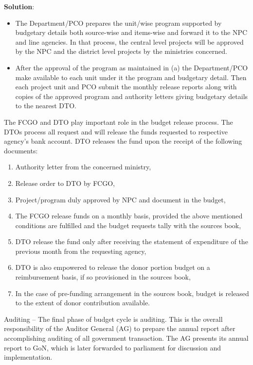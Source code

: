 \documentclass[
  openany]{book}
\newenvironment{solution}{ {\bfseries Solution}:}{}
\begin{document}
\begin{questions}
\begin{solution}
\begin{itemize}
\item The Department/PCO prepares the unit/wise program supported by budgetary details both source-wise and items-wise and forward it to the NPC and line agencies. In that process, the central level projects will be approved by the NPC and the district level projects by the ministries concerned.
\item After the approval of the program as maintained in (a) the Department/PCO make available to each unit under it the program and budgetary detail. Then each project unit and PCO submit the monthly release reports along with copies of the approved program and authority letters giving budgetary details to the nearest DTO.
\end{itemize}

The FCGO and DTO play important role in the budget release process. The DTOs process all request and will release the funds requested to respective agency's bank account. DTO releases the fund upon the receipt of the following documents:

\begin{enumerate}
\item Authority letter from the concerned ministry,
\item Release order to DTO by FCGO,
\item Project/program duly approved by NPC and document in the budget,
\item The FCGO release funds on a monthly basis, provided the above mentioned conditions are fulfilled and the budget requests tally with the sources book,
\item DTO release the fund only after receiving the statement of expenditure of the previous month from the requesting agency,
\item DTO is also empowered to release the donor portion budget on a reimbursement basis, if so provisioned in the sources book,
\item In the case of pre-funding arrangement in the sources book, budget is released to the extent of donor contribution available.
\end{enumerate}

Auditing -- The final phase of budget cycle is auditing. This is the overall responsibility of the Auditor General (AG) to prepare the annual report after accomplishing auditing of all government transaction. The AG presents its annual report to GoN, which is later forwarded to parliament for discussion and implementation.


\end{solution}
\end{questions}
\end{document}
